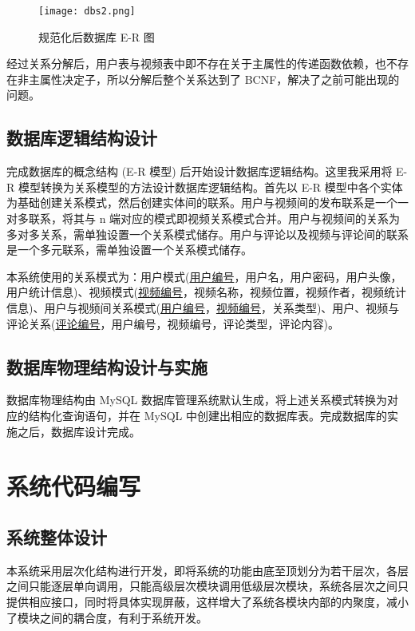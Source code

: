 \begin{figure}[!ht]
    \centering
    \texttt{[image: dbs2.png]}
    \caption{规范化后数据库 E-R 图}
    \label{fig:ER2}
\end{figure}

经过关系分解后，用户表与视频表中即不存在关于主属性的传递函数依赖，也不存在非主属性决定子，所以分解后整个关系达到了 BCNF\cite{bernstein1976synthesizing}，解决了之前可能出现的问题。

\subsection{数据库逻辑结构设计}

完成数据库的概念结构 (E-R 模型) 后开始设计数据库逻辑结构\cite{gamma1995design}。这里我采用将 E-R 模型转换为关系模型的方法设计数据库逻辑结构。首先以 E-R 模型中各个实体为基础创建关系模式，然后创建实体间的联系。用户与视频间的发布联系是一个一对多联系，将其与 n 端对应的模式即视频关系模式合并。用户与视频间的关系为多对多关系，需单独设置一个关系模式储存。用户与评论以及视频与评论间的联系是一个多元联系，需单独设置一个关系模式\cite{王珊2006数据库系统概论}储存。

本系统使用的关系模式为：用户模式(\uline{用户编号}，用户名，用户密码，用户头像，用户统计信息)、视频模式(\uline{视频编号}，视频名称，视频位置，视频作者，视频统计信息)、用户与视频间关系模式(\uline{用户编号}，\uline{视频编号}，关系类型)、用户、视频与评论关系(\uline{评论编号}，用户编号，视频编号，评论类型，评论内容)。

\subsection{数据库物理结构设计与实施}

数据库物理结构由 MySQL 数据库管理系统默认生成，将上述关系模式转换为对应的结构化查询语句，并在 MySQL 中创建出相应的数据库表。完成数据库的实施之后，数据库设计完成。



\section{系统代码编写}

\subsection{系统整体设计}
本系统采用层次化结构进行开发，即将系统的功能由底至顶划分为若干层次，各层之间只能逐层单向调用，只能高级层次模块调用低级层次模块，系统各层次之间只提供相应接口，同时将具体实现屏蔽，这样增大了系统各模块内部的内聚度，减小了模块之间的耦合度，有利于系统开发。

